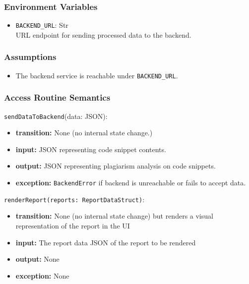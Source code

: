 \documentclass[12pt, titlepage]{article}
\begin{document}
\subsubsection{Environment Variables}

\begin{itemize}
    \item \texttt{BACKEND\_URL}: Str \\ 
    URL endpoint for sending processed data to the backend.
\end{itemize}

\subsubsection{Assumptions}

\begin{itemize}
    \item The backend service is reachable under \texttt{BACKEND\_URL}.
\end{itemize}

\subsubsection{Access Routine Semantics}

\noindent \texttt{sendDataToBackend}(data: JSON):
\begin{itemize}
    \item \textbf{transition:} None (no internal state change.)
    \item \textbf{input:} JSON representing code snippet contents.
    \item \textbf{output:} JSON representing plagiarism analysis on code snippets.
    \item \textbf{exception:} \texttt{BackendError} if backend is unreachable or fails to accept data.
\end{itemize}

\noindent \texttt{renderReport(reports: ReportDataStruct)}:
\begin{itemize}
    \item \textbf{transition:} None (no internal state change) but renders a visual representation of the 
    report in the UI
    \item \textbf{input:} The report data JSON of the report to be rendered
    \item \textbf{output:} None
    \item \textbf{exception:} None
\end{itemize}
\end{document}
